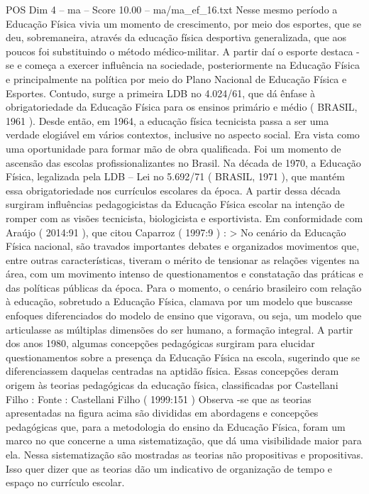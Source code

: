 \begin{textsample}{POS Dim 4 – ma – Score 10.00 – ma/ma\_ef\_16.txt}
Nesse mesmo período a Educação Física vivia um momento de crescimento, por meio dos esportes, que se deu, sobremaneira, através da educação física desportiva generalizada, que aos poucos foi substituindo o método médico-militar.
A partir daí o esporte destaca -se e começa a exercer influência na sociedade, posteriormente na Educação Física e principalmente na política por meio do Plano Nacional de Educação Física e Esportes.
Contudo, surge a primeira LDB no 4.024/61, que dá ênfase à obrigatoriedade da Educação Física para os ensinos primário e médio ( BRASIL, 1961 ).
Desde então, em 1964, a educação física tecnicista passa a ser uma verdade elogiável em vários contextos, inclusive no aspecto social.
Era vista como uma oportunidade para formar mão de obra qualificada.
Foi um momento de ascensão das escolas profissionalizantes no Brasil.
Na década de 1970, a Educação Física, legalizada pela LDB – Lei no 5.692/71 ( BRASIL, 1971 ), que mantém essa obrigatoriedade nos currículos escolares da época.
A partir dessa década surgiram influências pedagogicistas da Educação Física escolar na intenção de romper com as visões tecnicista, biologicista e esportivista.
Em conformidade com Araújo ( 2014:91 ), que citou Caparroz ( 1997:9 ) : > No cenário da Educação Física nacional, são travados importantes debates e organizados movimentos que, entre outras características, tiveram o mérito de tensionar as relações vigentes na área, com um movimento intenso de questionamentos e constatação das práticas e das políticas públicas da época.
Para o momento, o cenário brasileiro com relação à educação, sobretudo a Educação Física, clamava por um modelo que buscasse enfoques diferenciados do modelo de ensino que vigorava, ou seja, um modelo que articulasse as múltiplas dimensões do ser humano, a formação integral.
A partir dos anos 1980, algumas concepções pedagógicas surgiram para elucidar questionamentos sobre a presença da Educação Física na escola, sugerindo que se diferenciassem daquelas centradas na aptidão física.
Essas concepções deram origem às teorias pedagógicas da educação física, classificadas por Castellani Filho : Fonte : Castellani Filho ( 1999:151 ) Observa -se que as teorias apresentadas na figura acima são divididas em abordagens e concepções pedagógicas que, para a metodologia do ensino da Educação Física, foram um marco no que concerne a uma sistematização, que dá uma visibilidade maior para ela.
Nessa sistematização são mostradas as teorias não propositivas e propositivas.
Isso quer dizer que as teorias dão um indicativo de organização de tempo e espaço no currículo escolar.

\end{textsample}
